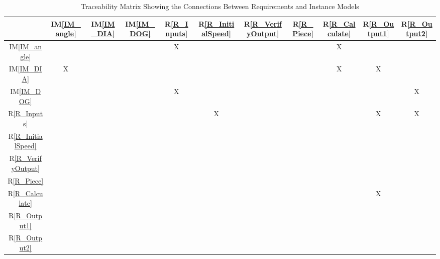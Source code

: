 \documentclass[12pt]{article}
\newcommand{\iref}[1]{IM\ref{#1}}
\newcommand{\rref}[1]{R\ref{#1}}
\begin{document}
	\begin{table}[h!]
		\centering
		\begin{tabular}{|c|c|c|c|c|c|c|c|c|c|c|}
			\hline
			& \iref{IM_angle}& \iref{IM_DIA}& \iref{IM_DOG}& \rref{R_Inputs}& \rref{R_InitialSpeed}& \rref{R_VerifyOutput}& \rref{R_Piece}& \rref{R_Calculate}& \rref{R_Output1}& \rref{R_Output2} \\
			\hline
			\iref{IM_angle}            & & & & X& & & & X& &\\ \hline
			\iref{IM_DIA}            & X& & & & & & & X& X&\\ \hline
			\iref{IM_DOG}          & & & & X& & & & & &X\\ \hline
			\rref{R_Inputs}          & & & & & X& & & & X&X\\ \hline
			\rref{R_InitialSpeed}     & & & & & & & & & &\\ \hline
			\rref{R_VerifyOutput}    & & & & & & & & & &\\ \hline
			\rref{R_Piece}    & & & & & & & & & &\\ \hline
			\rref{R_Calculate}   & & & & & & & & & X&\\ \hline
			\rref{R_Output1}  & & & & & & & & & &\\ \hline
			\rref{R_Output2}  & & & & & & & & & &\\ \hline
		\end{tabular}
		\caption{Traceability Matrix Showing the Connections Between Requirements and Instance Models}
		\label{Table:R_trace}
	\end{table}
	
	
	
\end{document}
